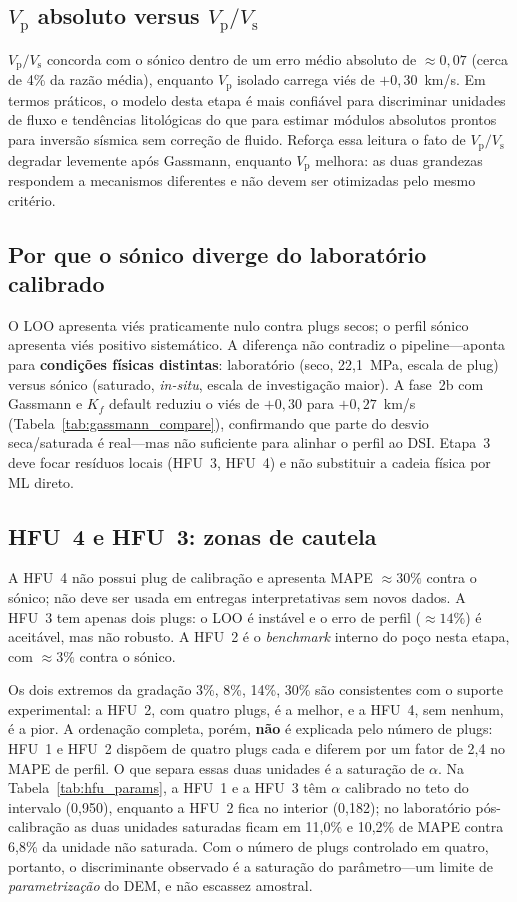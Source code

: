 \documentclass[11pt,a4paper]{article}
\numberwithin{equation}{section}
\newcommand{\Vp}{\ensuremath{V_{\mathrm{p}}}}
\newcommand{\VpVs}{\ensuremath{V_{\mathrm{p}}/V_{\mathrm{s}}}}
\begin{document}
\subsection{\Vp{} absoluto versus \VpVs{}}

\VpVs{} concorda com o sónico dentro de um erro médio absoluto de
$\approx 0{,}07$ (cerca de 4\% da razão média), enquanto \Vp{} isolado
carrega viés de $+0{,}30$~km/s.
Em termos práticos, o modelo desta etapa é mais confiável para
discriminar unidades de fluxo e tendências litológicas do que para
estimar módulos absolutos prontos para inversão sísmica sem correção
de fluido.
Reforça essa leitura o fato de \VpVs{} degradar levemente após Gassmann,
enquanto \Vp{} melhora: as duas grandezas respondem a mecanismos diferentes e
não devem ser otimizadas pelo mesmo critério.

\subsection{Por que o sónico diverge do laboratório calibrado}

O LOO apresenta viés praticamente nulo contra plugs secos; o perfil sónico
apresenta viés positivo sistemático.
A diferença não contradiz o pipeline---aponta para \textbf{condições
físicas distintas}: laboratório (seco, 22,1~MPa, escala de plug) versus
sónico (saturado, \emph{in-situ}, escala de investigação maior).
A fase~2b com Gassmann e $K_f$ default reduziu o viés de $+0{,}30$ para
$+0{,}27$~km/s (Tabela~\ref{tab:gassmann_compare}), confirmando que parte do
desvio seca/saturada é real---mas não suficiente para alinhar o perfil ao
DSI.
Etapa~3 deve focar resíduos locais (HFU~3, HFU~4) e não substituir a cadeia
física por ML direto.

\subsection{HFU~4 e HFU~3: zonas de cautela}
\label{sec:hfu_cautela}

A HFU~4 não possui plug de calibração e apresenta MAPE $\approx 30\%$
contra o sónico; não deve ser usada em entregas interpretativas sem novos
dados.
A HFU~3 tem apenas dois plugs: o LOO é instável e o erro de perfil
($\approx 14\%$) é aceitável, mas não robusto.
A HFU~2 é o \emph{benchmark} interno do poço nesta etapa, com
$\approx 3\%$ contra o sónico.

Os dois extremos da gradação 3\%, 8\%, 14\%, 30\% são consistentes com o
suporte experimental: a HFU~2, com quatro plugs, é a melhor, e a HFU~4, sem
nenhum, é a pior.
A ordenação completa, porém, \textbf{não} é explicada pelo número de plugs:
HFU~1 e HFU~2 dispõem de quatro plugs cada e diferem por um fator de 2,4 no
MAPE de perfil.
O que separa essas duas unidades é a saturação de $\alpha$.
Na Tabela~\ref{tab:hfu_params}, a HFU~1 e a HFU~3 têm $\alpha$ calibrado no
teto do intervalo (0,950), enquanto a HFU~2 fica no interior (0,182); no
laboratório pós-calibração as duas unidades saturadas ficam em 11,0\% e
10,2\% de MAPE contra 6,8\% da unidade não saturada.
Com o número de plugs controlado em quatro, portanto, o discriminante
observado é a saturação do parâmetro---um limite de \emph{parametrização} do
DEM, e não escassez amostral.
\end{document}
